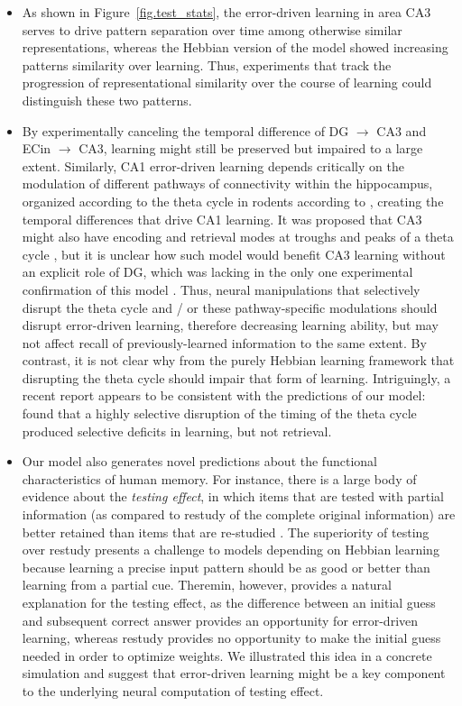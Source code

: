 \documentclass[11pt,twoside]{article}
\newif\myifpdf
\begin{document}
\begin{itemize}
    \item As shown in Figure~\ref{fig.test_stats}, the error-driven learning in area CA3 serves to drive pattern separation over time among otherwise similar representations, whereas the Hebbian version of the model showed increasing patterns similarity over learning.  Thus, experiments that track the progression of representational similarity over the course of learning could distinguish these two patterns.

    \item By experimentally canceling the temporal difference of DG $\rightarrow$ CA3 and ECin $\rightarrow$ CA3, learning might still be preserved but impaired to a large extent.  Similarly, CA1 error-driven learning \citep{KetzMorkondaOReilly13} depends critically on the modulation of different pathways of connectivity within the hippocampus, organized according to the theta cycle in rodents according to \citet{HasselmoBodelonWyble02}, creating the temporal differences that drive CA1 learning.  It was proposed that CA3 might also have encoding and retrieval modes at troughs and peaks of a theta cycle \citep{KunecHasselmoKopell05}, but it is unclear how such model would benefit CA3 learning without an explicit role of DG, which was lacking in the only one experimental confirmation of this model \citep{VillarrealGrossDerrick07}.  Thus, neural manipulations that selectively disrupt the theta cycle and / or these pathway-specific modulations should disrupt error-driven learning, therefore decreasing learning ability, but may not affect recall of previously-learned information to the same extent.  By contrast, it is not clear why from the purely Hebbian learning framework that disrupting the theta cycle should impair that form of learning.  Intriguingly, a recent report appears to be consistent with the predictions of our model: \citet{QuirkZutshiSrikanthEtAl21} found that a highly selective disruption of the timing of the theta cycle produced selective deficits in learning, but not retrieval.

    \item Our model also generates novel predictions about the functional characteristics of human memory. For instance, there is a large body of evidence about the \emph{testing effect}, in which items that are tested with partial information (as compared to restudy of the complete original information) are better retained than items that are re-studied  \citep{LiuOReillyRanganath21}.  The superiority of testing over restudy presents a challenge to models depending on Hebbian learning because learning a precise input pattern should be as good or better than learning from a partial cue. Theremin, however, provides a natural explanation for the testing effect, as the difference between an initial guess and subsequent correct answer provides an opportunity for error-driven learning, whereas restudy provides no opportunity to make the initial guess needed in order to optimize weights.  We illustrated this idea in a concrete simulation and suggest that error-driven learning might be a key component to the underlying neural computation of testing effect.
    
\end{itemize}
\end{document}
